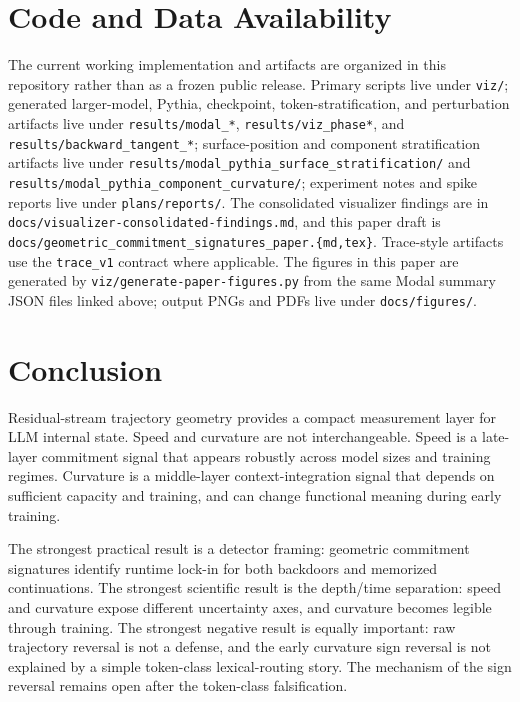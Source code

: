 \documentclass[11pt,letterpaper]{article}
\begin{document}
\section{Code and Data Availability}
\label{sec:availability}

The current working implementation and artifacts are organized in this
repository rather than as a frozen public release. Primary scripts live
under \texttt{viz/}; generated larger-model, Pythia, checkpoint,
token-stratification, and perturbation artifacts live under
\texttt{results/modal\_*}, \texttt{results/viz\_phase*}, and
\texttt{results/backward\_tangent\_*}; surface-position and component
stratification artifacts live under
\texttt{results/modal\_pythia\_surface\_stratification/} and
\texttt{results/modal\_pythia\_component\_curvature/}; experiment notes
and spike reports live under \texttt{plans/reports/}. The consolidated
visualizer findings are in
\texttt{docs/visualizer-consolidated-findings.md}, and this paper draft
is \texttt{docs/geometric\_commitment\_signatures\_paper.\{md,tex\}}.
Trace-style artifacts use the \texttt{trace\_v1} contract where
applicable. The figures in this paper are generated by
\texttt{viz/generate-paper-figures.py} from the same Modal summary JSON
files linked above; output PNGs and PDFs live under
\texttt{docs/figures/}.

\section{Conclusion}
\label{sec:conclusion}

Residual-stream trajectory geometry provides a compact measurement
layer for LLM internal state. Speed and curvature are not
interchangeable. Speed is a late-layer commitment signal that appears
robustly across model sizes and training regimes. Curvature is a
middle-layer context-integration signal that depends on sufficient
capacity and training, and can change functional meaning during early
training.

The strongest practical result is a detector framing: geometric
commitment signatures identify runtime lock-in for both backdoors and
memorized continuations. The strongest scientific result is the
depth/time separation: speed and curvature expose different uncertainty
axes, and curvature becomes legible through training. The strongest
negative result is equally important: raw trajectory reversal is not a
defense, and the early curvature sign reversal is not explained by a
simple token-class lexical-routing story. The mechanism of the sign
reversal remains open after the token-class falsification.
\end{document}
